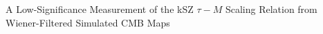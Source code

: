 \documentclass[]{article}
\begin{document}
A Low-Significance Measurement of the kSZ $\tau-M$ Scaling Relation from Wiener-Filtered Simulated CMB Maps
\end{document}

